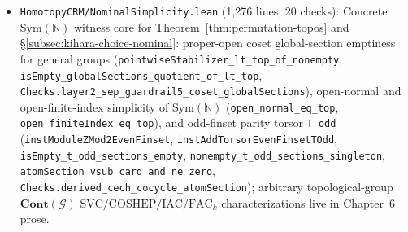 \documentclass[10pt,twoside,openright]{book}
\theoremstyle{crmplain}
\theoremstyle{crmdef}
\theoremstyle{crmremark}
\begin{document}
\begin{itemize}[leftmargin=1.5em]
  \item \texttt{HomotopyCRM/\allowbreak Nominal\allowbreak Simplicity.lean} (1,276 lines, 20 checks): Concrete $\mathrm{Sym}(\mathbb{N})$ witness core for Theorem~\ref{thm:permutation-topos} and \S\ref{subsec:kihara-choice-nominal}: proper-open coset global-section emptiness for general groups (\texttt{pointwiseStabilizer\_\allowbreak lt\_\allowbreak top\_\allowbreak of\_\allowbreak nonempty}, \texttt{isEmpty\_\allowbreak global\allowbreak Sections\_\allowbreak quotient\_\allowbreak of\_\allowbreak lt\_\allowbreak top}, \texttt{Checks.\allowbreak layer2\_\allowbreak sep\_\allowbreak guardrail5\_\allowbreak coset\_\allowbreak global\allowbreak Sections}), open-normal and open-finite-index simplicity of $\mathrm{Sym}(\mathbb{N})$ (\texttt{open\_\allowbreak normal\_\allowbreak eq\_\allowbreak top}, \texttt{open\_\allowbreak finite\allowbreak Index\_\allowbreak eq\_\allowbreak top}), and odd-finset parity torsor \texttt{T\_odd} (\texttt{instModuleZMod2EvenFinset}, \texttt{instAddTorsorEvenFinsetTOdd}, \texttt{isEmpty\_\allowbreak t\_\allowbreak odd\_\allowbreak sections\_\allowbreak empty}, \texttt{nonempty\_\allowbreak t\_\allowbreak odd\_\allowbreak sections\_\allowbreak singleton}, \texttt{atomSection\_\allowbreak vsub\_\allowbreak card\_\allowbreak and\_\allowbreak ne\_\allowbreak zero}, \texttt{Checks.\allowbreak derived\_\allowbreak cech\_\allowbreak cocycle\_\allowbreak atom\allowbreak Section}); arbitrary topological-group $\mathbf{Cont}(\mathcal{G})$ $\mathrm{SVC}/\mathrm{COSHEP}/\mathrm{IAC}/\mathrm{FAC}_k$ characterizations live in Chapter~6 prose.

\end{itemize}
\end{document}
